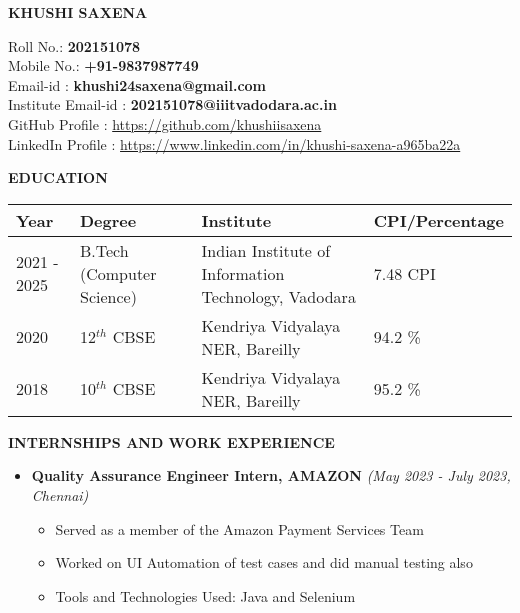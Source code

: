 \documentclass[a4paper,10pt]{article}
\newcommand{\resheading}[1]{\medskip
    \colorbox{mygrey}{\begin{minipage}{\dimexpr\textwidth-2\fboxsep\relax}\small 
                        \textbf{#1 \vphantom{p\^{E}}}
                      \end{minipage}}
                            \par\medskip}
\begin{document}
\linespread{1.25}

\begin{center} \fontsize{15}{15} \textbf{KHUSHI SAXENA} \end{center}
Roll No.: \textbf{202151078} \\
Mobile No.: \textbf{+91-9837987749} \\
Email-id : \textbf{khushi24saxena@gmail.com} \\
Institute Email-id : \textbf{202151078@iiitvadodara.ac.in} \\
GitHub Profile : \href{https://github.com/khushiisaxena}{https://github.com/khushiisaxena} \\
LinkedIn Profile : \href{https://www.linkedin.com/in/khushi-saxena-a965ba22a/}{https://www.linkedin.com/in/khushi-saxena-a965ba22a} \\


\resheading{\textbf{EDUCATION} }
\begin{tabularx}{\linewidth}{l X l l}
    \midrule
\textbf{Year}
     & \textbf{Degree}  & \textbf{Institute}   & \textbf{CPI/Percentage}   \\
    \midrule
2021 - 2025
     & B.Tech (Computer Science)
                        & Indian Institute of Information Technology, Vadodara            & 7.48 CPI         \\

2020 & 12$^{th}$ CBSE 
                        & Kendriya Vidyalaya NER, Bareilly    & 94.2 \%            \\

2018 & 10$^{th}$ CBSE 
                        & Kendriya Vidyalaya NER, Bareilly    & 95.2 \%           \\
    \midrule
\end{tabularx}

\resheading{\textbf{INTERNSHIPS AND WORK EXPERIENCE}}
\begin{itemize}
    \item \textbf{Quality Assurance Engineer Intern, AMAZON} \hfill \textit{(May 2023 - July 2023, Chennai)}
    \begin{itemize}
        \item Served as a member of the Amazon Payment Services Team
        
        \item Worked on UI Automation of test cases and did manual testing also 


        \item Tools and Technologies Used: Java and Selenium 

    \end{itemize}
\end{itemize}
\end{document}
